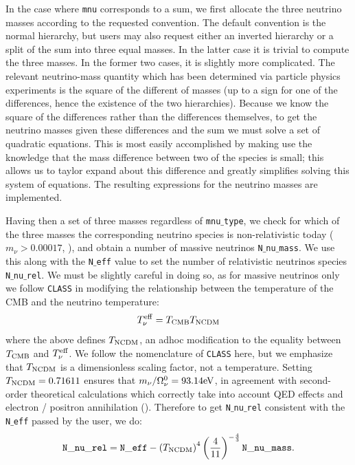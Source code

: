 \documentclass[\docopts]{\docclass}
\begin{document}
In the case where {\tt mnu} corresponds to a sum, we first allocate the three neutrino masses according to the requested convention. The default convention is the normal hierarchy, but users may also request either an inverted hierarchy or a split of the sum into three equal masses. In the latter case it is trivial to compute the three masses. In the former two cases, it is slightly more complicated. The relevant neutrino-mass quantity which has been determined via particle physics experiments is the square of the different of masses (up to a sign for one of the differences, hence the existence of the two hierarchies). Because we know the square of the differences rather than the differences themselves, to get the neutrino masses given these differences and the sum we must solve a set of quadratic equations. This is most easily accomplished by making use the knowledge that the mass difference between two of the species is small; this allows us to taylor expand about this difference and greatly simplifies solving this system of equations. The resulting expressions for the neutrino masses are implemented.


Having then a set of three masses regardless of {\tt mnu$\_$type}, we check for which of the three masses the corresponding neutrino species is non-relativistic today ($m_\nu>0.00017$, \citealt{Lesgourgues2012}), and obtain a number of massive neutrinos {\tt N$\_$nu$\_$mass}. We use this along with the {\tt N$\_$eff} value to set the number of relativistic neutrinos species {\tt N$\_$nu$\_$rel}. We must be slightly careful in doing so, as for massive neutrinos only we follow {\tt CLASS} in modifying the relationship between the temperature of the CMB and the neutrino temperature:
\begin{equation}
T_{\nu}^{\rm eff} = T_{\rm CMB} T_{\rm NCDM}
\label{Tnueff}
\end{equation}
where the above defines $T_{\rm NCDM}$, an adhoc modification to the equality between $T_{\rm CMB}$ and $T_{\nu}^{\rm eff}$. We follow the nomenclature of {\tt CLASS} here, but we emphasize that $T_{\rm NCDM}$ is a dimensionless scaling factor, not a temperature. Setting $T_{\rm NCDM}=0.71611$ ensures that $m_{\nu} / \Omega_{\nu}^0 = 93.14 {\rm eV}$, in agreement with second-order theoretical calculations which correctly take into account QED effects and electron / positron annihilation (\citealt{Mangano2005}). Therefore to get {\tt N$\_$nu$\_$rel} consistent with the {\tt N$\_$eff} passed by the user, we do:
\begin{equation}
{\tt N\_nu\_rel} = {\tt N\_eff} - \left(T_{\rm NCDM}\right)^{4} \left(\frac{4}{11}\right)^{-\frac{4}{3}} {\tt N\_nu\_mass}.
\label{Nnurel}
\end{equation}
\end{document}

